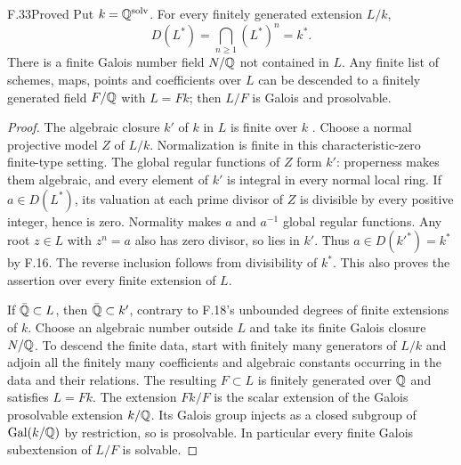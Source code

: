 \begin{claim}{F.33}{Proved}
Put $k=\mathbb Q^{\mathrm{solv}}$. For every finitely generated
extension $L/k$,
\[
 D(L^*)=\bigcap_{n\ge1}(L^*)^n=k^*.
\]
There is a finite Galois number field $N/\mathbb Q$ not contained in
$L$. Any finite list of schemes, maps, points and coefficients
over $L$ can be descended to a finitely generated field
$F/\mathbb Q$ with $L=Fk$; then $L/F$ is Galois and prosolvable.
\end{claim}
\begin{proof}
The algebraic closure $k'$ of $k$ in $L$ is finite over $k$
\citep[Lemma~9.26.11]{F_StacksFields}. Choose a normal projective
model $Z$ of $L/k$. Normalization is finite in this
characteristic-zero finite-type setting. The global regular
functions of $Z$ form $k'$: properness makes them algebraic,
and every element of $k'$ is integral in every normal local ring.
If $a\in D(L^*)$, its valuation at each prime divisor of $Z$
is divisible by every positive integer, hence is zero. Normality
makes $a$ and $a^{-1}$ global regular functions. Any root
$z\in L$ with $z^n=a$ also has zero divisor, so lies in $k'$.
Thus $a\in D(k'^*)=k^*$ by F.16. The reverse inclusion follows
from divisibility of $k^*$. This also proves the assertion over
every finite extension of $L$.

If $\bar{\mathbb Q}\subset L$, then $\bar{\mathbb Q}\subset k'$, contrary to
F.18's unbounded degrees of finite extensions of $k$.
Choose an algebraic number outside $L$ and take its finite
Galois closure $N/\mathbb Q$. To descend the finite data, start with
finitely many generators of $L/k$ and adjoin all the finitely
many coefficients and algebraic constants occurring in the data
and their relations. The resulting $F\subset L$ is finitely
generated over $\mathbb Q$ and satisfies $L=Fk$.
The extension $Fk/F$ is the scalar extension of the Galois
prosolvable extension $k/\mathbb Q$. Its Galois group injects as a
closed subgroup of $\operatorname{Gal}(k/\mathbb Q)$ by restriction,
so is prosolvable. In particular every finite Galois subextension
of $L/F$ is solvable.
\end{proof}

